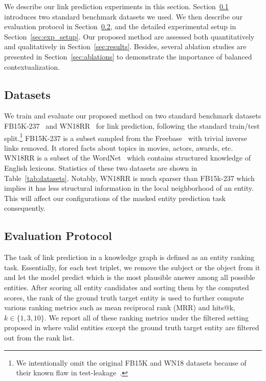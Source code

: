 \documentclass[11pt]{article}
\begin{document}
 We describe our link prediction experiments in this section.
Section~\ref{sec:datasets} introduces two standard benchmark datasets we used.
We then describe our evaluation protocol in Section~\ref{sec:eval_protocal}, and the detailed experimental setup in Section~\ref{sec:exp_setup}. 
Our proposed method are assessed both quantitatively and qualitatively in Section~\ref{sec:results}.
Besides, several ablation studies are presented in Section~\ref{sec:ablations} to demonstrate the importance of balanced contextualization.

\subsection{Datasets}
\label{sec:datasets}
We train and evaluate our proposed method on two standard benchmark datasets FB15K-237~\cite{toutanova-chen-2015-observed} and WN18RR~\cite{dettmers2018conve} for link prediction, following the standard train/test split.\footnote{We intentionally omit the original FB15K and WN18 datasets because of their known flaw in test-leakage~\cite{toutanova-chen-2015-observed}.}
FB15K-237 is a subset sampled from the Freebase~\cite{bollacker2008freebase} with trivial inverse links removed.
It stored facts about topics in movies, actors, awards, etc.
WN18RR is a subset of the WordNet~\cite{miller1995wordnet} which contains structured knowledge of English lexicons.
Statistics of these two datasets are shown in Table~\ref{tab:datasets}.
Notably, WN18RR is much sparser than FB15k-237 which implies it has less structural information in the local neighborhood of an entity.
This will affect our configurations of the masked entity prediction task consequently.


\subsection{Evaluation Protocol}
\label{sec:eval_protocal}
The task of link prediction in a knowledge graph is defined as an entity ranking task.
Essentially, for each test triplet, we remove the subject or the object from it and let the model predict which is the most plausible answer among all possible entities.
After scoring all entity candidates and sorting them by the computed scores, the rank of the ground truth target entity is used to further compute various ranking metrics such as mean reciprocal rank (MRR) and hits@k, $k\in \{1, 3, 10\}$.
We report all of these ranking metrics under the filtered setting proposed in \citet{bordes2013transe} where valid entities except the ground truth target entity are filtered out from the rank list.
\end{document}
